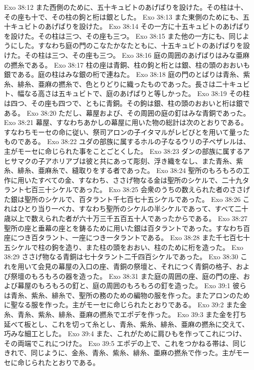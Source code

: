 Exo 38:12  また西側のために、五十キュビトのあげばりを設けた。その柱は十、その座も十で、その柱の鉤と桁は銀とした。
Exo 38:13  また東側のためにも、五十キュビトのあげばりを設けた。
Exo 38:14  その一方に十五キュビトのあげばりを設けた。その柱は三つ、その座も三つ。
Exo 38:15  また他の一方にも、同じようにした。すなわち庭の門のこなたかなたともに、十五キュビトのあげばりを設けた。その柱は三つ、その座も三つ。
Exo 38:16  庭の周囲のあげばりはみな亜麻の撚糸である。
Exo 38:17  柱の座は青銅、柱の鉤と桁とは銀、柱の頭のおおいも銀である。庭の柱はみな銀の桁で連ねた。
Exo 38:18  庭の門のとばりは青糸、紫糸、緋糸、亜麻の撚糸で、色とりどりに織ったものであった。長さは二十キュビト、幅なる高さは五キュビトで、庭のあげばりと等しかった。
Exo 38:19  その柱は四つ、その座も四つで、ともに青銅。その鉤は銀、柱の頭のおおいと桁は銀である。
Exo 38:20  ただし、幕屋および、その周囲の庭の釘はみな青銅であった。
Exo 38:21  幕屋、すなわちあかしの幕屋に用いた物の総計は次のとおりである。すなわちモーセの命に従い、祭司アロンの子イタマルがレビびとを用いて量ったものである。
Exo 38:22  ユダの部族に属するホルの子なるウリの子ベザレルは、主がモーセに命じられた事をことごとくした。
Exo 38:23  ダンの部族に属するアヒサマクの子アホリアブは彼と共にあって彫刻、浮き織をなし、また青糸、紫糸、緋糸、亜麻糸で、縫取りをする者であった。
Exo 38:24  聖所のもろもろの工作に用いたすべての金、すなわち、ささげ物なる金は聖所のシケルで、二十九タラント七百三十シケルであった。
Exo 38:25  会衆のうちの数えられた者のささげた銀は聖所のシケルで、百タラント千七百七十五シケルであった。
Exo 38:26  これはひとり当り一ベカ、すなわち聖所のシケルの半シケルであって、すべて二十歳以上で数えられた者が六十万三千五百五十人であったからである。
Exo 38:27  聖所の座と垂幕の座とを鋳るために用いた銀は百タラントであった。すなわち百座につき百タラント、一座につき一タラントである。
Exo 38:28  また千七百七十五シケルで柱の鉤を造り、また柱の頭をおおい、柱のために桁を造った。
Exo 38:29  ささげ物なる青銅は七十タラント二千四百シケルであった。
Exo 38:30  これを用いて会見の幕屋の入口の座、青銅の祭壇と、それにつく青銅の格子、および祭壇のもろもろの器を造った。
Exo 38:31  また庭の周囲の座、庭の門の座、および幕屋のもろもろの釘と、庭の周囲のもろもろの釘を造った。
Exo 39:1  彼らは青糸、紫糸、緋糸で、聖所の務のための編物の服を作った。またアロンのために聖なる服を作った。主がモーセに命じられたとおりである。
Exo 39:2  また金糸、青糸、紫糸、緋糸、亜麻の撚糸でエポデを作った。
Exo 39:3  また金を打ち延べて板とし、これを切って糸とし、青糸、紫糸、緋糸、亜麻の撚糸に交えて、巧みな細工とした。
Exo 39:4  また、これがために肩ひもを作ってこれにつけ、その両端でこれにつけた。
Exo 39:5  エポデの上で、これをつかねる帯は、同じきれで、同じように、金糸、青糸、紫糸、緋糸、亜麻の撚糸で作った。主がモーセに命じられたとおりである。
